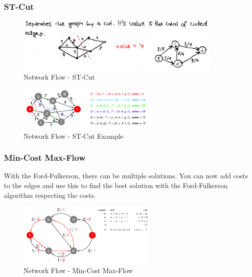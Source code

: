 \subsubsection{ST-Cut}

\begin{figure}[H]
\centering
\includegraphics[width=0.9\textwidth]{figures/stCut.png}
\caption{Network Flow - ST-Cut}
\end{figure}

\begin{figure}[H]
\centering
\includegraphics[width=0.6\textwidth]{figures/st-cut.png}
\caption{Network Flow - ST-Cut Example}
\end{figure}

\subsubsection{Min-Cost Max-Flow}

With the Ford-Fulkerson, there can be multiple solutions. You can now add costs to the edges and use this to find the best solution with the Ford-Fulkerson algorithm respecting the costs.

\begin{figure}[H]
\centering
\includegraphics[width=0.6\textwidth]{figures/min-cost-max-flow.png}
\caption{Network Flow - Min-Cost Max-Flow}
\end{figure}

\clearpage